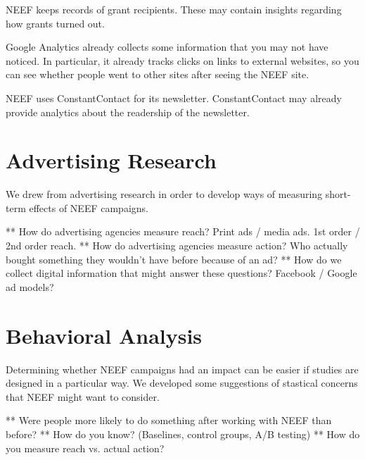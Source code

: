 \documentclass{article}
\begin{document}
NEEF keeps records of grant recipients. These may contain insights regarding
how grants turned out.

Google Analytics already collects some information that you may not have noticed.
In particular, it already tracks clicks on links to external websites, so you
can see whether people went to other sites after seeing the NEEF site.

NEEF uses ConstantContact for its newsletter. ConstantContact may already
provide analytics about the readership of the newsletter.

\section{Advertising Research}
We drew from advertising research in order to develop ways of measuring
short-term effects of NEEF campaigns.

** How do advertising agencies measure reach?  Print ads / media ads.  1st order / 2nd order reach.
** How do advertising agencies measure action?  Who actually bought something they wouldn't have before because of an ad?
** How do we collect digital information that might answer these questions?  Facebook / Google ad models?

\section{Behavioral Analysis}
Determining whether NEEF campaigns had an impact
can be easier if studies are designed in a particular way.
We developed some suggestions of stastical concerns that
NEEF might want to consider.

** Were people more likely to do something after working with NEEF than before?
** How do you know?  (Baselines, control groups, A/B testing)
** How do you measure reach vs. actual action?
\end{document}
